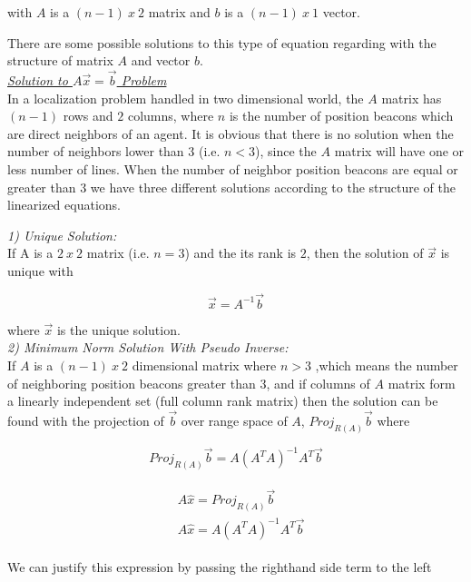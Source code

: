 with $A$ is a $(n-1)\ x\ 2$ matrix and $b$ is a $(n-1)\ x\ 1$ vector.

There are some possible solutions to this type of equation regarding with the structure of matrix $A$ and vector $b$.\\

\underline {\textit{Solution to $A\vec{x} = \vec{b}$ Problem}}\\
In a localization problem handled in two dimensional world, the $A$ matrix has $(n-1)$ rows and $2$ columns, where $n$ is the number of position beacons which are direct neighbors of an agent. It is obvious that there is no solution when the number of neighbors lower than $3$ (i.e. $n<3$), since the $A$ matrix will have one or less number of lines. When the number of neighbor position beacons are equal or greater than $3$ we have three different solutions according to the structure of the linearized equations.

\textit{1) Unique Solution:}\\
 If A is a $2\ x\ 2$ matrix (i.e. $n=3$) and the its rank is $2$, then the solution of $\vec{x}$ is unique with \cite{linear_ders_notu}

\begin{equation}
\vec{x} = A^{-1}\vec{b}
\end{equation}

where $\vec{x}$ is the unique solution. \\
  
\textit{ 2) Minimum Norm Solution With Pseudo Inverse:} \\  
If $A$ is a $(n-1)\ x\ 2$ dimensional matrix where $n>3$ ,which means the number of neighboring position beacons greater than $3$, and if columns of $A$ matrix form a linearly independent set (full column rank matrix) then the solution can be found with the projection of $\vec{b}$ over range space of $A$, $Proj_{R(A)}\vec{b}$ where \cite{linear_ders_notu}

\begin{equation}
Proj_{R(A)}\vec{b} = A (A^TA)^{-1}A^T\vec{b}
\end{equation}

\begin{align}
\begin{split}
& A\hat{x} = Proj_{R(A)}\vec{b}\\
& A\hat{x} = A(A^TA)^{-1}A^T\vec{b}
\end{split}
\end{align}
 
We can justify this expression by passing the righthand side term to the left

